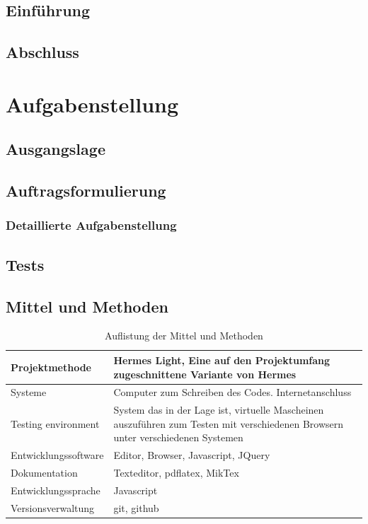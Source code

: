 \documentclass[11pt,paper=a4,final]{scrartcl}
\begin{document}
\subsection{Einf\"uhrung}
\subsection{Abschluss}
\section{Aufgabenstellung}
\subsection{Ausgangslage}
\subsection{Auftragsformulierung}
\subsubsection{Detaillierte Aufgabenstellung}
\subsection{Tests}
\subsection{Mittel und Methoden}
\begin{table}[h!]
 \centering
  \begin{tabular}{|l|p{10cm}|}
  \hline
  Projektmethode & Hermes Light, Eine auf den Projektumfang zugeschnittene Variante von Hermes \\ \hline
  Systeme & Computer zum Schreiben des Codes. Internetanschluss \\ \hline
  Testing environment & System das in der Lage ist, virtuelle Mascheinen auszuf\"uhren zum Testen mit verschiedenen Browsern unter verschiedenen Systemen \\ \hline
  Entwicklungssoftware & Editor, Browser, Javascript, JQuery \\ \hline
  Dokumentation & Texteditor, pdflatex, MikTex \\ \hline
  Entwicklungssprache & Javascript \\ \hline
  Versionsverwaltung & git, github \\ \hline
  \end{tabular}
  \caption{Auflistung der Mittel und Methoden}
\end{table}
\end{document}
